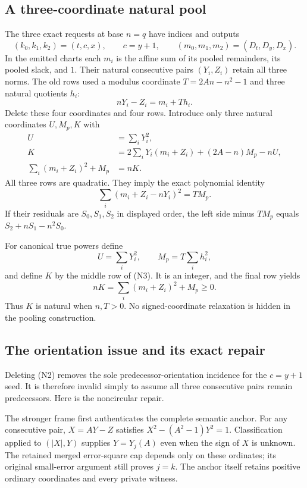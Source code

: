 \subsection{A three-coordinate natural pool}
The three exact requests at base $n=q$ have indices and outputs
\[
 (k_0,k_1,k_2)=(t,c,x),\qquad c=y+1,\qquad
 (m_0,m_1,m_2)=(D_t,D_y,D_x).
\]
In the emitted charts each $m_i$ is the affine sum of its pooled remainders,
its pooled slack, and $1$. Their natural consecutive pairs $(Y_i,Z_i)$
retain all three norms. The old rows used a modulus coordinate
$T=2An-n^2-1$ and three natural quotients $h_i$:
\[
 nY_i-Z_i=m_i+Th_i.                                      \tag{N2}
\]
Delete these four coordinates and four rows. Introduce only three natural
coordinates $U,M_p,K$ with
\begin{align}
 U&=\sum_iY_i^2,\nonumber\\
 K&=2\sum_iY_i(m_i+Z_i)+(2A-n)M_p-nU,\nonumber\\
 \sum_i(m_i+Z_i)^2+M_p&=nK.                              \tag{N3}
\end{align}
All three rows are quadratic. They imply the exact polynomial identity
\[
 \sum_i(m_i+Z_i-nY_i)^2=T M_p.                           \tag{N4}
\]
If their residuals are $S_0,S_1,S_2$ in displayed order, the left side
minus $TM_p$ equals $S_2+nS_1-n^2S_0$.

For canonical true powers define
\[
 U=\sum_iY_i^2,\qquad M_p=T\sum_i h_i^2,
\]
and define $K$ by the middle row of (N3). It is an integer, and the final
row yields
\[
 nK=\sum_i(m_i+Z_i)^2+M_p\ge0.
\]
Thus $K$ is natural when $n,T>0$. No signed-coordinate relaxation is
hidden in the pooling construction.

\subsection{The orientation issue and its exact repair}
Deleting (N2) removes the sole predecessor-orientation incidence for the
$c=y+1$ seed. It is therefore invalid simply to assume all three consecutive
pairs remain predecessors. Here is the noncircular repair.

The stronger frame first authenticates the complete semantic anchor.
For any consecutive pair, $X=AY-Z$ satisfies
$X^2-(A^2-1)Y^2=1$. Classification applied to $(|X|,Y)$ supplies
$Y=Y_j(A)$ even when the sign of $X$ is unknown. The retained merged
error-square cap depends only on these ordinates; its original small-error
argument still proves $j=k$. The anchor itself retains positive ordinary
coordinates and every private witness.

